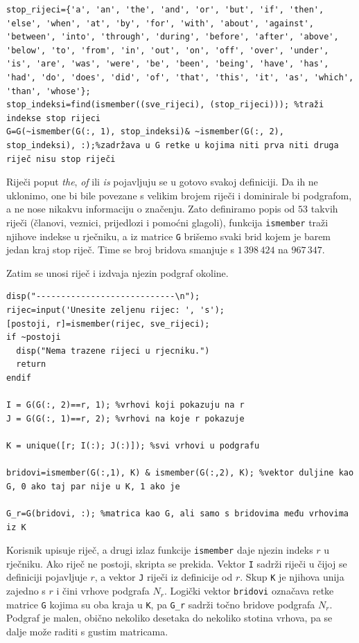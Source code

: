 \documentclass[12pt, letterpaper]{article}
\numberwithin{figure}{section}
\begin{document}
\begin{lstlisting}[style=octave, caption={Uklanjanje stop riječi}, label={lst:rj_stop}]
stop_rijeci={'a', 'an', 'the', 'and', 'or', 'but', 'if', 'then', 'else', 'when', 'at', 'by', 'for', 'with', 'about', 'against', 'between', 'into', 'through', 'during', 'before', 'after', 'above', 'below', 'to', 'from', 'in', 'out', 'on', 'off', 'over', 'under', 'is', 'are', 'was', 'were', 'be', 'been', 'being', 'have', 'has', 'had', 'do', 'does', 'did', 'of', 'that', 'this', 'it', 'as', 'which', 'than', 'whose'};
stop_indeksi=find(ismember((sve_rijeci), (stop_rijeci))); %traži indekse stop rijeci
G=G(~ismember(G(:, 1), stop_indeksi)& ~ismember(G(:, 2), stop_indeksi), :);%zadržava u G retke u kojima niti prva niti druga riječ nisu stop riječi
\end{lstlisting}
Riječi poput \emph{the}, \emph{of} ili \emph{is} pojavljuju se u gotovo svakoj definiciji. Da ih ne uklonimo, one bi bile povezane s velikim brojem riječi i dominirale bi podgrafom, a ne nose nikakvu informaciju o značenju. Zato definiramo popis od $53$ takvih riječi (članovi, veznici, prijedlozi i pomoćni glagoli), funkcija \texttt{ismember} traži njihove indekse u rječniku, a iz matrice \texttt{G} brišemo svaki brid kojem je barem jedan kraj stop riječ. Time se broj bridova smanjuje s $1\,398\,424$ na $967\,347$.

Zatim se unosi riječ i izdvaja njezin podgraf okoline.

\begin{lstlisting}[style=octave, caption={Podgraf okoline zadane riječi}, label={lst:rj_podgraf}]
disp("----------------------------\n");
rijec=input('Unesite zeljenu rijec: ', 's');
[postoji, r]=ismember(rijec, sve_rijeci);
if ~postoji
  disp("Nema trazene rijeci u rjecniku.")
  return
endif

I = G(G(:, 2)==r, 1); %vrhovi koji pokazuju na r
J = G(G(:, 1)==r, 2); %vrhovi na koje r pokazuje

K = unique([r; I(:); J(:)]); %svi vrhovi u podgrafu

bridovi=ismember(G(:,1), K) & ismember(G(:,2), K); %vektor duljine kao G, 0 ako taj par nije u K, 1 ako je

G_r=G(bridovi, :); %matrica kao G, ali samo s bridovima među vrhovima iz K
\end{lstlisting}
Korisnik upisuje riječ, a drugi izlaz funkcije \texttt{ismember} daje njezin indeks $r$ u rječniku. Ako riječ ne postoji, skripta se prekida. Vektor \texttt{I} sadrži riječi u čijoj se definiciji pojavljuje $r$, a vektor \texttt{J} riječi iz definicije od $r$. Skup \texttt{K} je njihova unija zajedno s $r$ i čini vrhove podgrafa $N_r$. Logički vektor \texttt{bridovi} označava retke matrice \texttt{G} kojima su oba kraja u \texttt{K}, pa \texttt{G\_r} sadrži točno bridove podgrafa $N_r$. Podgraf je malen, obično nekoliko desetaka do nekoliko stotina vrhova, pa se dalje može raditi s gustim matricama.
\end{document}
